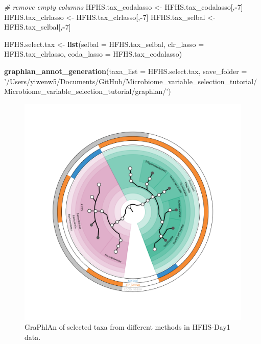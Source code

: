 \documentclass[openany]{book}
\newenvironment{Shaded}{\begin{snugshade}}{\end{snugshade}}
\newcommand{\KeywordTok}[1]{\textcolor[rgb]{0.13,0.29,0.53}{\textbf{#1}}}
\newcommand{\DataTypeTok}[1]{\textcolor[rgb]{0.13,0.29,0.53}{#1}}
\newcommand{\DecValTok}[1]{\textcolor[rgb]{0.00,0.00,0.81}{#1}}
\newcommand{\StringTok}[1]{\textcolor[rgb]{0.31,0.60,0.02}{#1}}
\newcommand{\CommentTok}[1]{\textcolor[rgb]{0.56,0.35,0.01}{\textit{#1}}}
\newcommand{\OperatorTok}[1]{\textcolor[rgb]{0.81,0.36,0.00}{\textbf{#1}}}
\newcommand{\NormalTok}[1]{#1}
\begin{document}
\begin{Shaded}
\begin{Highlighting}[]
\CommentTok{# remove empty columns}
\NormalTok{HFHS.tax_codalasso <-}\StringTok{ }\NormalTok{HFHS.tax_codalasso[,}\OperatorTok{-}\DecValTok{7}\NormalTok{] }
\NormalTok{HFHS.tax_clrlasso <-}\StringTok{ }\NormalTok{HFHS.tax_clrlasso[,}\OperatorTok{-}\DecValTok{7}\NormalTok{]}
\NormalTok{HFHS.tax_selbal <-}\StringTok{ }\NormalTok{HFHS.tax_selbal[,}\OperatorTok{-}\DecValTok{7}\NormalTok{]}

\NormalTok{HFHS.select.tax <-}\StringTok{ }\KeywordTok{list}\NormalTok{(}\DataTypeTok{selbal =}\NormalTok{ HFHS.tax_selbal,}
                        \DataTypeTok{clr_lasso =}\NormalTok{ HFHS.tax_clrlasso,}
                        \DataTypeTok{coda_lasso =}\NormalTok{ HFHS.tax_codalasso)}

\KeywordTok{graphlan_annot_generation}\NormalTok{(}\DataTypeTok{taxa_list =}\NormalTok{ HFHS.select.tax, }
\DataTypeTok{save_folder =} \StringTok{'/Users/yiwenw5/Documents/GitHub/Microbiome_variable_selection_tutorial/Microbiome_variable_selection_tutorial/graphlan/'}\NormalTok{)}
\end{Highlighting}
\end{Shaded}

\begin{figure}

{\centering \includegraphics[width=1\linewidth]{./graphlan/taxa} 

}

\caption{GraPhlAn of selected taxa from different methods in HFHS-Day1 data.}\label{fig:graphlanHFHS}
\end{figure}
\end{document}
